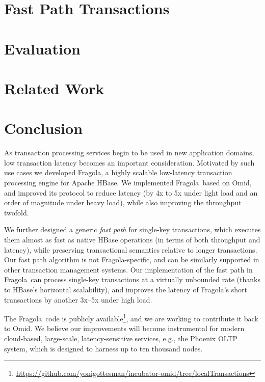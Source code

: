 \documentclass[letterpaper,twocolumn,10pt]{article}
\newcommand{\sys}{Fragola}
\begin{document}
\section{Fast Path Transactions}
\label{sec:alg}


\section{Evaluation} \label{sec:eval}


\section{Related Work} \label{sec:related}


\section{Conclusion} \label{sec:conclusions}

As transaction processing services begin to be used in new application domains, low 
transaction latency becomes an important consideration. 
Motivated by such use cases we developed \sys, a highly scalable 
low-latency transaction processing engine for Apache HBase. 
We implemented \sys\ based on Omid, and 
improved its protocol to reduce latency (by 4x to 5x under light load
and an order of magnitude under heavy load), while also improving the 
throughput twofold.  

We further designed a generic \emph{fast path} for single-key transactions, 
which executes them  almost as fast as native HBase operations (in terms of 
both throughput and latency), while preserving
transactional semantics relative to longer transactions.
Our fast path algorithm is not \sys-specific, and can be similarly supported in 
other transaction management systems.
Our implementation of the fast path in \sys\ can process single-key
transactions  at a virtually unbounded rate (thanks to HBase's horizontal 
scalability), and improves the latency of \sys's short transactions
by another 3x--5x under high load.

The \sys\ code is publicly available\footnote{\url{https://github.com/yonigottesman/incubator-omid/tree/localTransactions}}, and 
we are working to contribute it back to Omid. 
We believe our improvements will become instrumental for modern cloud-based, large-scale, 
latency-sensitive services, e.g., the Phoenix OLTP system, which is designed 
to harness up to ten thousand nodes.


\newpage



\end{document}
